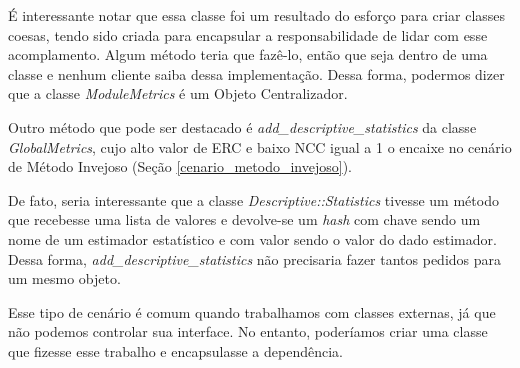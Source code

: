 É interessante notar que essa classe foi um resultado do esforço para criar classes coesas, tendo sido
criada para encapsular a responsabilidade de lidar com esse acomplamento. Algum método teria que fazê-lo,
então que seja dentro de uma classe e nenhum cliente saiba dessa implementação. Dessa forma, podermos dizer
que a classe \textit{ModuleMetrics} é um Objeto Centralizador.

Outro método que pode ser destacado é \textit{add\_descriptive\_statistics} da classe 
\textit{GlobalMetrics}, cujo alto valor de ERC e baixo NCC igual a 1 o encaixe no cenário de Método 
Invejoso (Seção \ref{cenario_metodo_invejoso}).



De fato, seria interessante que a classe \textit{Descriptive::Statistics} tivesse um método que recebesse
uma lista de valores e devolve-se um \textit{hash} com chave sendo um nome de um estimador estatístico e
com valor sendo o valor do dado estimador. Dessa forma, \textit{add\_descriptive\_statistics} não 
precisaria fazer tantos pedidos para um mesmo objeto.

Esse tipo de cenário é comum quando trabalhamos com classes externas, já que não podemos controlar
sua interface. No entanto, poderíamos criar uma classe que fizesse esse trabalho e encapsulasse
a dependência.

